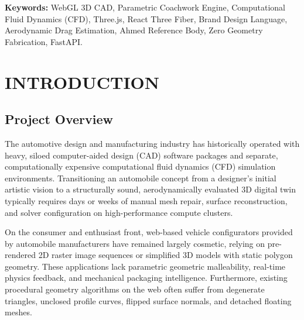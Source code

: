 \documentclass[12pt,a4paper]{report}
\begin{document}
\vspace{0.4cm}
\noindent\textbf{Keywords:} WebGL 3D CAD, Parametric Coachwork Engine, Computational Fluid Dynamics (CFD), Three.js, React Three Fiber, Brand Design Language, Aerodynamic Drag Estimation, Ahmed Reference Body, Zero Geometry Fabrication, FastAPI.
\newpage

\begingroup
\small{}\setlength{\parskip}{2pt}
\tableofcontents
\endgroup
\newpage
\begingroup
\small{}\setlength{\parskip}{2pt}
\listoffigures
\vspace{0.8cm}
\begingroup
\let\clearpage\relax
\let\cleardoublepage\relax
\listoftables
\endgroup
\endgroup
\newpage

\setcounter{page}{1}

\chapter{INTRODUCTION}

\section{Project Overview}
The automotive design and manufacturing industry has historically operated with heavy, siloed computer-aided design (CAD) software packages and separate, computationally expensive computational fluid dynamics (CFD) simulation environments. Transitioning an automobile concept from a designer's initial artistic vision to a structurally sound, aerodynamically evaluated 3D digital twin typically requires days or weeks of manual mesh repair, surface reconstruction, and solver configuration on high-performance compute clusters.

On the consumer and enthusiast front, web-based vehicle configurators provided by automobile manufacturers have remained largely cosmetic, relying on pre-rendered 2D raster image sequences or simplified 3D models with static polygon geometry. These applications lack parametric geometric malleability, real-time physics feedback, and mechanical packaging intelligence. Furthermore, existing procedural geometry algorithms on the web often suffer from degenerate triangles, unclosed profile curves, flipped surface normals, and detached floating meshes.
\end{document}
